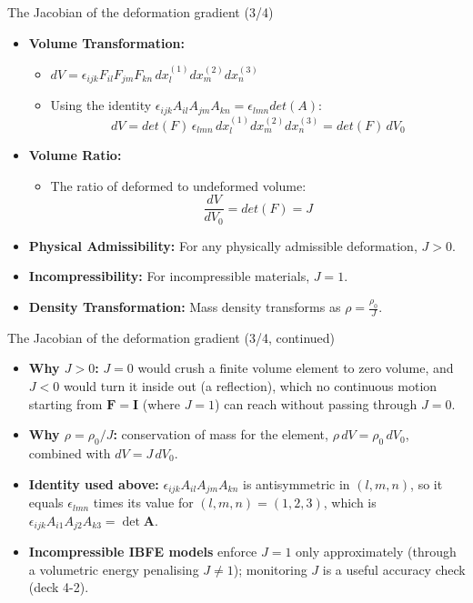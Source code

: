 \documentclass[aspectratio=169,11pt]{beamer}
\begin{document}
\begin{frame}{The Jacobian of the deformation gradient (3/4)}
\begin{itemize}
    \item \textbf{Volume Transformation:}
        \begin{itemize}
            \item   $dV = \epsilon_{ijk} F_{il} F_{jm} F_{kn}\, dx^{(1)}_l dx^{(2)}_m dx^{(3)}_n$
            \item   Using the identity $\epsilon_{ijk} A_{il} A_{jm} A_{kn} = \epsilon_{lmn} det(A)$:
                \[
                dV = det(F)\, \epsilon_{lmn}\, dx^{(1)}_l dx^{(2)}_m dx^{(3)}_n = det(F)\, dV_0
                \]
        \end{itemize}
    \item \textbf{Volume Ratio:}
        \begin{itemize}
            \item   The ratio of deformed to undeformed volume:
                \[
                \frac{dV}{dV_0} = det(F) = J
                \]
        \end{itemize}
    \item \textbf{Physical Admissibility:} For any physically admissible deformation, $J > 0$.
    \item \textbf{Incompressibility:} For incompressible materials, $J = 1$.
    \item \textbf{Density Transformation:} Mass density transforms as $\rho = \frac{\rho_0}{J}$.
\end{itemize}
\end{frame}

\begin{frame}{The Jacobian of the deformation gradient (3/4, continued)}
\begin{itemize}
    \item \textbf{Why $J>0$:} $J=0$ would crush a finite volume element to zero volume, and $J<0$ would turn it inside out (a reflection), which no continuous motion starting from $\mathbf{F}=\mathbf{I}$ (where $J=1$) can reach without passing through $J=0$.
    \item \textbf{Why $\rho=\rho_0/J$:} conservation of mass for the element, $\rho\,dV = \rho_0\,dV_0$, combined with $dV = J\,dV_0$.
    \item \textbf{Identity used above:} $\epsilon_{ijk}A_{il}A_{jm}A_{kn}$ is antisymmetric in $(l,m,n)$, so it equals $\epsilon_{lmn}$ times its value for $(l,m,n)=(1,2,3)$, which is $\epsilon_{ijk}A_{i1}A_{j2}A_{k3}=\det\mathbf{A}$.
    \item \textbf{Incompressible IBFE models} enforce $J=1$ only approximately (through a volumetric energy penalising $J\neq 1$); monitoring $J$ is a useful accuracy check (deck 4-2).
\end{itemize}
\end{frame}
\end{document}
